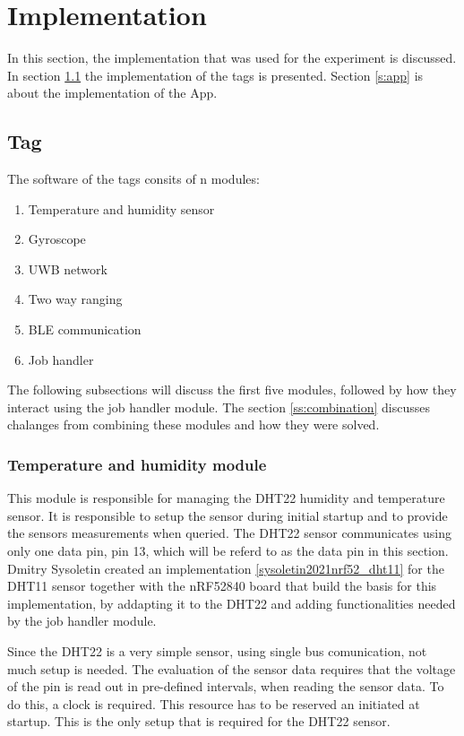 \chapter{Implementation}
\label{c:implementation}

In this section, the implementation that was used for the experiment is discussed.
In section \ref{s:tag} the implementation of the tags is presented.
Section \ref{s:app} is about the implementation of the App.

\section{Tag}
\label{s:tag}
The software of the tags consits of n modules:
\begin{enumerate}
	\item Temperature and humidity sensor
	\item Gyroscope
	\item UWB network
	\item Two way ranging
	\item BLE communication
	\item Job handler
\end{enumerate}
The following subsections will discuss the first five modules, followed by how they interact using the job handler module.
The section \ref{ss:combination} discusses chalanges from combining these modules and how they were solved.

\subsection{Temperature and humidity module}
\label{ss:temp_hum_module}
This module is responsible for managing the DHT22 humidity and temperature sensor.
It is responsible to setup the sensor during initial startup and to provide the sensors measurements when queried.
The DHT22 sensor communicates using only one data pin, pin 13, which will be referd to as the data pin in this section.
Dmitry Sysoletin created an implementation \ref{sysoletin2021nrf52_dht11} for the DHT11 sensor together with the nRF52840 board that build the basis for this implementation, by addapting it to the DHT22 and adding functionalities needed by the job handler module.


Since the DHT22 is a very simple sensor, using single bus comunication, not much setup is needed.
The evaluation of the sensor data requires that the voltage of the pin is read out in pre-defined intervals, when reading the sensor data.
To do this, a clock is required.
This resource has to be reserved an initiated at startup.
This is the only setup that is required for the DHT22 sensor.


